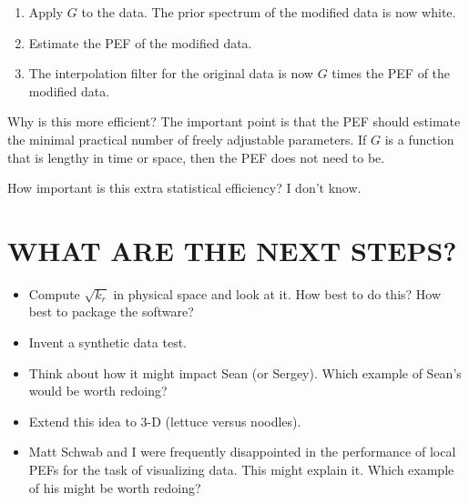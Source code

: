 \begin{enumerate}
\item
        Apply $G$ to the data.
        The prior spectrum of the modified data is now white.
\item Estimate the PEF of the modified data.
\item The interpolation filter for the original data
        is now $G$ times the PEF of the modified data.
\end{enumerate}

Why is this more efficient?
The important point is that the PEF should estimate
the minimal practical number of freely adjustable parameters.
If $G$ is a function that is lengthy in time or space,
then the PEF does not need to be.

\par
How important is this extra statistical efficiency?
I don't know.

\section{WHAT ARE THE NEXT STEPS?}

\begin{itemize}
\item Compute $\sqrt{k_r}$ in physical space and look at it.
How best to do this?
How best to package the software?
\item Invent a synthetic data test.
\item Think about how it might impact Sean (or Sergey).
        Which example of Sean's would be worth redoing?
\item Extend this idea to 3-D (lettuce versus noodles).
\item Matt Schwab and I were frequently disappointed in the performance
of local PEFs for the task of visualizing data.
This might explain it.
Which example of his might be worth redoing?
\end{itemize}




